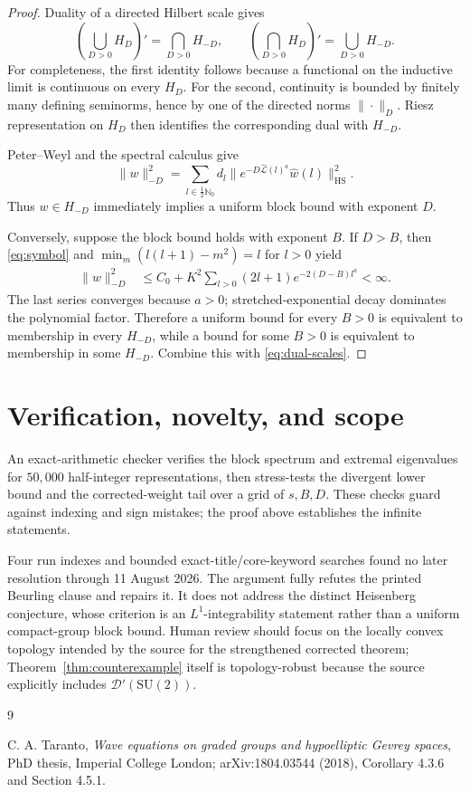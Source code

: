 \documentclass[11pt]{article}
\newcommand{\SU}{\mathrm{SU}(2)}
\newcommand{\cL}{\mathcal L}
\newcommand{\HS}{\mathrm{HS}}
\newcommand{\N}{\mathbb N}
\begin{document}
\begin{proof}
Duality of a directed Hilbert scale gives
\begin{equation}\label{eq:dual-scales}
 \left(\bigcup_{D>0}H_D\right)'=\bigcap_{D>0}H_{-D},
 \qquad
 \left(\bigcap_{D>0}H_D\right)'=\bigcup_{D>0}H_{-D}.
\end{equation}
For completeness, the first identity follows because a functional on the
inductive limit is continuous on every \(H_D\).  For the second, continuity
is bounded by finitely many defining seminorms, hence by one of the directed
norms \(\|\cdot\|_D\).  Riesz representation on \(H_D\) then identifies the
corresponding dual with \(H_{-D}\).

Peter--Weyl and the spectral calculus give
\begin{equation}\label{eq:weighted-pw}
 \|w\|_{-D}^2
 =\sum_{l\in\frac12\N_0}d_l
   \|e^{-D\widehat{\cL}(l)^a}\widehat w(l)\|_{\HS}^2.
\end{equation}
Thus \(w\in H_{-D}\) immediately implies a uniform block bound with
exponent \(D\).

Conversely, suppose the block bound holds with exponent \(B\).  If \(D>B\),
then \eqref{eq:symbol} and \(\min_m(l(l+1)-m^2)=l\) for \(l>0\) yield
\begin{align*}
 \|w\|_{-D}^2
 &\le C_0+K^2\sum_{l>0}(2l+1)e^{-2(D-B)l^a}<\infty.
\end{align*}
The last series converges because \(a>0\); stretched-exponential decay
dominates the polynomial factor.  Therefore a uniform bound for every
\(B>0\) is equivalent to membership in every \(H_{-D}\), while a bound for
some \(B>0\) is equivalent to membership in some \(H_{-D}\).  Combine this
with \eqref{eq:dual-scales}.
\end{proof}

\section{Verification, novelty, and scope}

An exact-arithmetic checker verifies the block spectrum and extremal
eigenvalues for \(50{,}000\) half-integer representations, then stress-tests
the divergent lower bound and the corrected-weight tail over a grid of
\(s,B,D\).  These checks guard against indexing and sign mistakes; the proof
above establishes the infinite statements.

Four run indexes and bounded exact-title/core-keyword searches found no later
resolution through 11 August 2026.  The argument fully refutes the printed
Beurling clause and repairs it.  It does not address the distinct Heisenberg
conjecture, whose criterion is an \(L^1\)-integrability statement rather than
a uniform compact-group block bound.  Human review should focus on the
locally convex topology intended by the source for the strengthened corrected
theorem; Theorem~\ref{thm:counterexample} itself is topology-robust because
the source explicitly includes \(\mathcal D'(\SU)\).

\begin{thebibliography}{9}
\raggedright
{}
C. A. Taranto,
\emph{Wave equations on graded groups and hypoelliptic Gevrey spaces},
PhD thesis, Imperial College London; arXiv:1804.03544 (2018),
Corollary 4.3.6 and Section 4.5.1.
\end{thebibliography}
\end{document}
